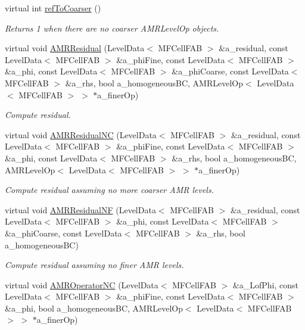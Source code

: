 \begin{DoxyCompactItemize}
virtual int \hyperlink{classnwomfconductivityop_a6b4322420b5006f9ef47bb6cdba14df3}{ref\+To\+Coarser} ()
\begin{DoxyCompactList}\small\item\em Returns 1 when there are no coarser A\+M\+R\+Level\+Op objects. \end{DoxyCompactList}\item 
virtual void \hyperlink{classnwomfconductivityop_acf54a68fb590c03cf35443c122cc37b1}{A\+M\+R\+Residual} (Level\+Data$<$ M\+F\+Cell\+F\+AB $>$ \&a\+\_\+residual, const Level\+Data$<$ M\+F\+Cell\+F\+AB $>$ \&a\+\_\+phi\+Fine, const Level\+Data$<$ M\+F\+Cell\+F\+AB $>$ \&a\+\_\+phi, const Level\+Data$<$ M\+F\+Cell\+F\+AB $>$ \&a\+\_\+phi\+Coarse, const Level\+Data$<$ M\+F\+Cell\+F\+AB $>$ \&a\+\_\+rhs, bool a\+\_\+homogeneous\+BC, A\+M\+R\+Level\+Op$<$ Level\+Data$<$ M\+F\+Cell\+F\+AB $>$ $>$ $\ast$a\+\_\+finer\+Op)
\begin{DoxyCompactList}\small\item\em Compute residual. \end{DoxyCompactList}\item 
virtual void \hyperlink{classnwomfconductivityop_a6a6d01e9e10e75c45115ae05e300c7c1}{A\+M\+R\+Residual\+NC} (Level\+Data$<$ M\+F\+Cell\+F\+AB $>$ \&a\+\_\+residual, const Level\+Data$<$ M\+F\+Cell\+F\+AB $>$ \&a\+\_\+phi\+Fine, const Level\+Data$<$ M\+F\+Cell\+F\+AB $>$ \&a\+\_\+phi, const Level\+Data$<$ M\+F\+Cell\+F\+AB $>$ \&a\+\_\+rhs, bool a\+\_\+homogeneous\+BC, A\+M\+R\+Level\+Op$<$ Level\+Data$<$ M\+F\+Cell\+F\+AB $>$ $>$ $\ast$a\+\_\+finer\+Op)
\begin{DoxyCompactList}\small\item\em Compute residual assuming no more coarser A\+MR levels. \end{DoxyCompactList}\item 
virtual void \hyperlink{classnwomfconductivityop_a04e33f978c1a286aab7284cf96f429a7}{A\+M\+R\+Residual\+NF} (Level\+Data$<$ M\+F\+Cell\+F\+AB $>$ \&a\+\_\+residual, const Level\+Data$<$ M\+F\+Cell\+F\+AB $>$ \&a\+\_\+phi, const Level\+Data$<$ M\+F\+Cell\+F\+AB $>$ \&a\+\_\+phi\+Coarse, const Level\+Data$<$ M\+F\+Cell\+F\+AB $>$ \&a\+\_\+rhs, bool a\+\_\+homogeneous\+BC)
\begin{DoxyCompactList}\small\item\em Compute residual assuming no finer A\+MR levels. \end{DoxyCompactList}\item 
virtual void \hyperlink{classnwomfconductivityop_ac50945d44a9145f7a436e62c08668b3b}{A\+M\+R\+Operator\+NC} (Level\+Data$<$ M\+F\+Cell\+F\+AB $>$ \&a\+\_\+\+Lof\+Phi, const Level\+Data$<$ M\+F\+Cell\+F\+AB $>$ \&a\+\_\+phi\+Fine, const Level\+Data$<$ M\+F\+Cell\+F\+AB $>$ \&a\+\_\+phi, bool a\+\_\+homogeneous\+BC, A\+M\+R\+Level\+Op$<$ Level\+Data$<$ M\+F\+Cell\+F\+AB $>$ $>$ $\ast$a\+\_\+finer\+Op)

\end{DoxyCompactItemize}
